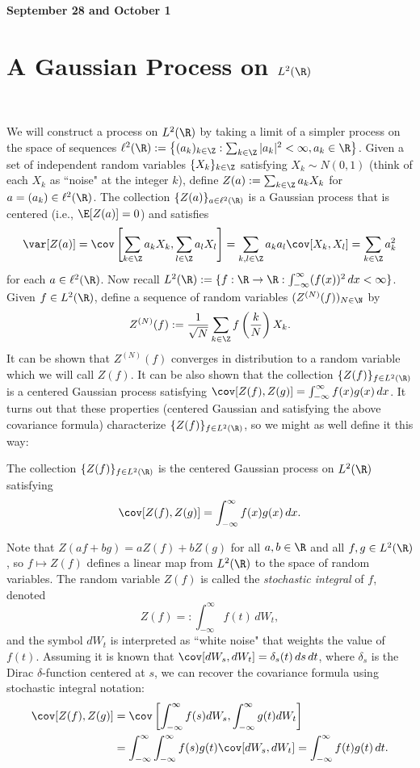 



\textbf{\Large September 28 and October 1}

\section{A Gaussian Process on $L^2(\R)$}\

We will construct a process on $L^2(\R)$ by taking a limit of a simpler process on the space of sequences $\ell^2(\R):=\left\{(a_k)_{k\in\Z}:\sum_{k\in\Z}|a_k|^2<\infty,a_k\in\R\right\}$. Given a set of independent random variables $\{X_k\}_{k\in\Z}$ satisfying $X_k\sim N(0,1)$ (think of each $X_k$ as ``noise" at the integer $k$), define $Z(a):=\sum_{k\in\Z}a_kX_k$ for $a=(a_k)\in\ell^2(\R)$. The collection $\{Z(a)\}_{a\in\ell^2(\R)}$ is a Gaussian process that is centered (i.e., $\E[Z(a)]=0$) and satisfies $$\var[Z(a)]=\cov\left[\sum_{k\in\Z}a_kX_k,\sum_{l\in\Z}a_lX_l\right]=\sum_{k,l\in\Z}a_ka_l\cov[X_k,X_l]=\sum_{k\in\Z}a_k^2$$ for each $a\in\ell^2(\R)$. Now recall $L^2(\R):=\{f:\R\to\R:\int_{-\infty}^\infty(f(x))^2\,dx<\infty\}$. Given $f\in L^2(\R)$, define a sequence of random variables $(Z^{(N)}(f))_{N\in\N}$ by $$Z^{(N)}(f):=\frac{1}{\sqrt{N}}\sum_{k\in\Z}f\left(\frac{k}{N}\right)X_k.$$ It can be shown that $Z^{(N)}(f)$ converges in distribution to a random variable which we will call $Z(f)$. It can be also shown that the collection $\{Z(f)\}_{f\in L^2(\R)}$ is a centered Gaussian process satisfying $\cov[Z(f),Z(g)]=\int_{-\infty}^\infty f(x)g(x)\,dx$. It turns out that these properties (centered Gaussian and satisfying the above covariance formula) characterize $\{Z(f)\}_{f\in L^2(\R)}$, so we might as well define it this way:

\begin{defn}
The collection $\{Z(f)\}_{f\in L^2(\R)}$ is the centered Gaussian process on $L^2(\R)$ satisfying $$\cov[Z(f),Z(g)]=\int_{-\infty}^\infty f(x)g(x)\,dx.$$
\end{defn} 

Note that $Z(af+bg)=aZ(f)+bZ(g)$ for all $a,b\in\R$ and all $f,g\in L^2(\R)$, so $f\mapsto Z(f)$ defines a linear map from $L^2(\R)$ to the space of random variables. The random variable $Z(f)$ is called the \emph{stochastic integral} of $f$, denoted $$Z(f)=:\int_{-\infty}^\infty f(t)\,dW_t,$$ and the symbol $dW_t$ is interpreted as ``white noise" that weights the value of $f(t)$. Assuming it is known that $\cov[dW_s,dW_t]=\delta_s(t)\,ds\,dt$, where $\delta_s$ is the Dirac $\delta$-function centered at $s$, we can recover the covariance formula using stochastic integral notation:
\begin{align*}
\cov[Z(f),Z(g)]&=\cov\left[\int_{-\infty}^\infty f(s)dW_s,\int_{-\infty}^\infty g(t)dW_t\right]\\
&=\int_{-\infty}^\infty\int_{-\infty}^\infty f(s)g(t)\cov[dW_s,dW_t]=\int_{-\infty}^\infty f(t)g(t)\,dt.
\end{align*}

